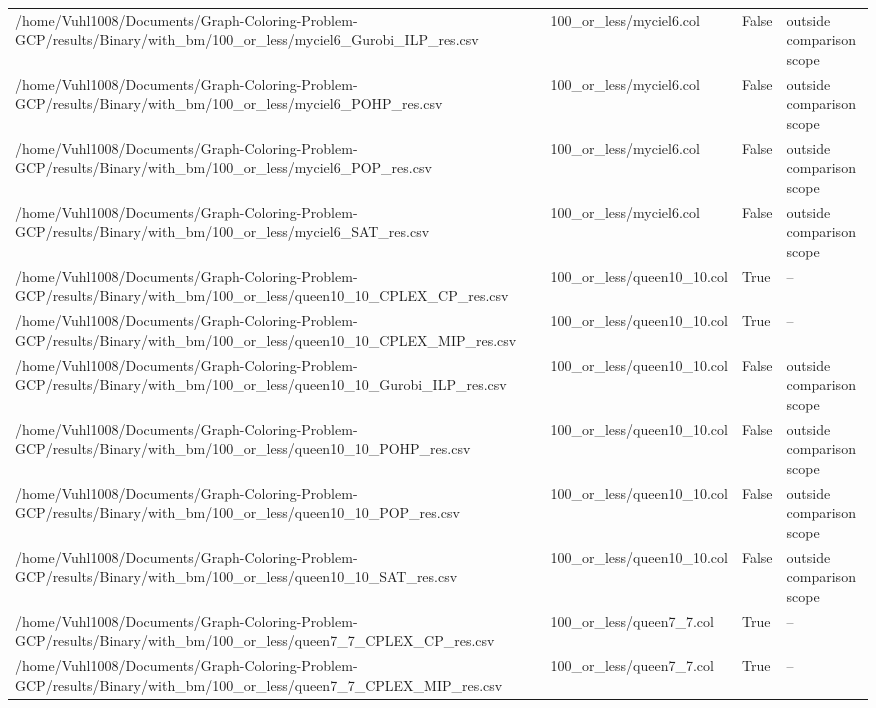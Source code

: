 \begin{table}[htbp]
\begin{tabular}{llll}
/home/Vuhl1008/Documents/Graph-Coloring-Problem-GCP/results/Binary/with\_bm/100\_or\_less/myciel6\_Gurobi\_ILP\_res.csv & 100\_or\_less/myciel6.col & False & outside comparison scope \\
/home/Vuhl1008/Documents/Graph-Coloring-Problem-GCP/results/Binary/with\_bm/100\_or\_less/myciel6\_POHP\_res.csv & 100\_or\_less/myciel6.col & False & outside comparison scope \\
/home/Vuhl1008/Documents/Graph-Coloring-Problem-GCP/results/Binary/with\_bm/100\_or\_less/myciel6\_POP\_res.csv & 100\_or\_less/myciel6.col & False & outside comparison scope \\
/home/Vuhl1008/Documents/Graph-Coloring-Problem-GCP/results/Binary/with\_bm/100\_or\_less/myciel6\_SAT\_res.csv & 100\_or\_less/myciel6.col & False & outside comparison scope \\
/home/Vuhl1008/Documents/Graph-Coloring-Problem-GCP/results/Binary/with\_bm/100\_or\_less/queen10\_10\_CPLEX\_CP\_res.csv & 100\_or\_less/queen10\_10.col & True & -- \\
/home/Vuhl1008/Documents/Graph-Coloring-Problem-GCP/results/Binary/with\_bm/100\_or\_less/queen10\_10\_CPLEX\_MIP\_res.csv & 100\_or\_less/queen10\_10.col & True & -- \\
/home/Vuhl1008/Documents/Graph-Coloring-Problem-GCP/results/Binary/with\_bm/100\_or\_less/queen10\_10\_Gurobi\_ILP\_res.csv & 100\_or\_less/queen10\_10.col & False & outside comparison scope \\
/home/Vuhl1008/Documents/Graph-Coloring-Problem-GCP/results/Binary/with\_bm/100\_or\_less/queen10\_10\_POHP\_res.csv & 100\_or\_less/queen10\_10.col & False & outside comparison scope \\
/home/Vuhl1008/Documents/Graph-Coloring-Problem-GCP/results/Binary/with\_bm/100\_or\_less/queen10\_10\_POP\_res.csv & 100\_or\_less/queen10\_10.col & False & outside comparison scope \\
/home/Vuhl1008/Documents/Graph-Coloring-Problem-GCP/results/Binary/with\_bm/100\_or\_less/queen10\_10\_SAT\_res.csv & 100\_or\_less/queen10\_10.col & False & outside comparison scope \\
/home/Vuhl1008/Documents/Graph-Coloring-Problem-GCP/results/Binary/with\_bm/100\_or\_less/queen7\_7\_CPLEX\_CP\_res.csv & 100\_or\_less/queen7\_7.col & True & -- \\
/home/Vuhl1008/Documents/Graph-Coloring-Problem-GCP/results/Binary/with\_bm/100\_or\_less/queen7\_7\_CPLEX\_MIP\_res.csv & 100\_or\_less/queen7\_7.col & True & -- \\

\end{tabular}
\end{table}
